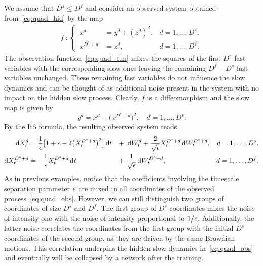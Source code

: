 \documentclass{article}
\begin{document}
We assume that $D^s\leq D^f$ and consider an observed system obtained from~\eqref{eq:quad_hid} by the map
\begin{gather}\label{eq:quad_fun}
    f\ \colon\left\{\ 
    \begin{aligned}
        x^d &= y^d + (z^d)^2, & d=1,\dotsc,D^s,\\
        x^{D^s+d} &= z^d, & d=1,\dotsc,D^f.
    \end{aligned}\right.
\end{gather}
The observation function~\eqref{eq:quad_fun} mixes the squares of the first $D^s$ fast variables with the corresponding slow ones leaving the remaining $D^f-D^s$ fast variables unchanged. These remaining fast variables do not influence the slow dynamics and can be thought of as additional noise present in the system with no impact on the hidden slow process. Clearly, $f$ is a diffeomorphism and the slow map is given by
\begin{equation}\label{eq:quad_slo}
    y^d = x^d - \big(x^{D^s+d}\big)^2,\quad d=1,\dotsc,D^s.
\end{equation}
By the It\^{o} formula, the resulting observed system reads
\begin{gather}\label{eq:quad_obs}
    \begin{aligned}
        \der{X}^d_t &= \frac{1}{\ep}\big[1+\ep- 2\big(X^{D^s+d}_t\big)^2\big]\der{t} &+\ & \der{W}^d_t + \frac{2}{\sqrt{\ep}}X^{D^s+d}_t\der{W}^{D^s+d}_t, & d=1,\dotsc,D^s,\\
        \der{X}^{D^s+d}_t &=-\frac{1}{\ep}X^{D^s+d}_t\der{t} &+\ & \frac{1}{\sqrt{\ep}}\der{W}^{D^s+d}_t, & d=1,\dotsc,D^f.
    \end{aligned}
\end{gather}
As in previous examples, notice that the coefficients involving the timescale separation parameter $\epsilon$ are mixed in all coordinates of the observed process~\eqref{eq:quad_obs}. However, we can still distinguish two groups of coordinates of size $D^s$ and $D^f$. The first group of $D^s$ coordinates mixes the noise of intensity one with the noise of intensity proportional to $1/\epsilon$. Additionally, the latter noise correlates the coordinates from the first group with the initial $D^s$ coordinates of the second group, as they are driven by the same Brownian motions. This correlation underpins the hidden slow dynamics in~\eqref{eq:quad_obs} and eventually will be collapsed by a network after the training.
\end{document}
